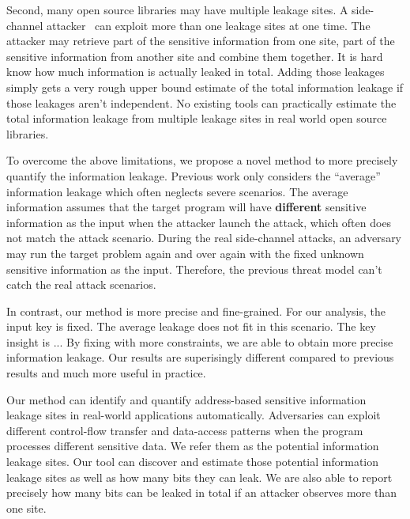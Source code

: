 Second, many open source libraries may have multiple leakage sites. 
A side-channel attacker~\cite{191010,7163052,hornby2011side} can exploit more than one leakage 
sites at one time. 
The attacker may retrieve part of the sensitive information from one site, part of the sensitive
information from another site and combine them together.
It is hard know how much information is actually leaked in total. Adding those leakages 
simply gets a very rough upper bound estimate of the total information leakage if those 
leakages aren’t independent. No existing tools can practically estimate the total information 
leakage from multiple leakage sites in real world open source libraries.

To overcome the above limitations, we propose a novel method
to more precisely quantify the information leakage. Previous work only considers the
``average'' information leakage which often neglects severe scenarios.
The average information assumes that the target program will have \textbf{different} sensitive 
information as the input when the attacker launch the attack,
which often does not match the attack scenario. During the real side-channel
attacks, an adversary may run the target problem again and over again with the 
fixed unknown sensitive information as the input. Therefore, the previous
threat model can't catch the real attack scenarios.

In contrast, our method is more precise and fine-grained. 
For our analysis, the input key is fixed.
The average leakage does not fit in this scenario.
The key insight is ...  
By fixing with more constraints, we are able to obtain more precise information leakage.
Our results are superisingly different compared to previous results
and much more useful in practice.
 

Our method can identify and quantify address-based
sensitive information leakage sites in real-world applications automatically. 
Adversaries can exploit different control-flow transfer and data-access patterns when 
the program processes different sensitive data. We refer them as the potential information
leakage sites. Our tool can discover and estimate those potential information leakage sites 
as well as how many bits they can leak. We are also able to report precisely how many bits
can be leaked in total if an attacker observes more than one site.

